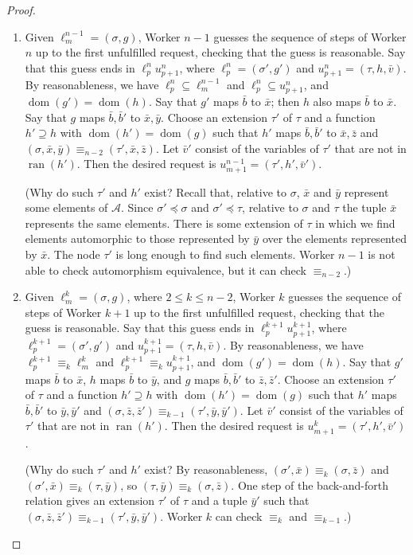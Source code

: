 \documentclass[10pt,a4paper]{article}
\DeclareMathOperator{\dom}{dom}
\DeclareMathOperator{\ran}{ran}
\theoremstyle{definition}
\begin{document}
\begin{proof}
\begin{enumerate}
			\item Given $\ell^{n-1}_m = (\sigma,g)$, Worker $n-1$ guesses the sequence of steps of Worker $n$ up to the first unfulfilled request, checking that the guess is reasonable. Say that this guess ends in $\ell^n_p u^n_{p+1}$, where $\ell^n_p = (\sigma',g')$ and $u^n_{p+1} = (\tau,h,\bar{v})$. By reasonableness, we have $\ell^n_p\subseteq\ell^{n-1}_m$ and $\ell^n_p\subseteq u^n_{p+1}$, and $\dom(g')=\dom(h)$. Say that $g'$ maps $\bar{b}$ to $\bar{x}$; then $h$ also maps $\bar{b}$ to $\bar{x}$. Say that $g$ maps $\bar{b},\bar{b}'$ to $\bar{x},\bar{y}$. Choose an extension $\tau'$ of $\tau$ and a function $h'\supseteq h$ with $\dom(h')=\dom(g)$ such that $h'$ maps $\bar{b},\bar{b}'$ to $\bar{x},\bar{z}$ and $(\sigma,\bar{x},\bar{y})\equiv_{n-2}(\tau',\bar{x},\bar{z})$. Let $\bar{v}'$ consist of the variables of $\tau'$ that are not in $\ran(h')$. Then the desired request is $u^{n-1}_{m+1}=(\tau',h',\bar{v}')$. \par (Why do such $\tau'$ and $h'$ exist? Recall that, relative to $\sigma$, $\bar{x}$ and $\bar{y}$ represent some elements of $\mathcal{A}$. Since $\sigma'\preceq\sigma$ and $\sigma'\preceq\tau$, relative to $\sigma$ and $\tau$ the tuple $\bar{x}$ represents the same elements. There is some extension of $\tau$ in which we find elements automorphic to those represented by $\bar{y}$ over the elements represented by $\bar{x}$. The node $\tau'$ is long enough to find such elements. Worker $n-1$ is not able to check automorphism equivalence, but it can check $\equiv_{n-2}$.)
			
			\item Given $\ell^k_m = (\sigma,g)$, where $2\leq k\leq n-2$, Worker $k$ guesses the sequence of steps of Worker $k+1$ up to the first unfulfilled request, checking that the guess is reasonable. Say that this guess ends in $\ell^{k+1}_p u^{k+1}_{p+1}$, where $\ell^{k+1}_p = (\sigma',g')$ and $u^{k+1}_{p+1} = (\tau,h,\bar{v})$. By reasonableness, we have $\ell^{k+1}_p\equiv_k\ell^k_m$ and $\ell^{k+1}_p\equiv_k u^{k+1}_{p+1}$, and $\dom(g')=\dom(h)$. Say that $g'$ maps $\bar{b}$ to $\bar{x}$, $h$ maps $\bar{b}$ to $\bar{y}$, and $g$ maps $\bar{b},\bar{b}'$ to $\bar{z},\bar{z}'$. Choose an extension $\tau'$ of $\tau$ and a function $h'\supseteq h$ with $\dom(h')=\dom(g)$ such that $h'$ maps $\bar{b},\bar{b}'$ to $\bar{y},\bar{y}'$ and $(\sigma,\bar{z},\bar{z}')\equiv_{k-1}(\tau',\bar{y},\bar{y}')$. Let $\bar{v}'$ consist of the variables of $\tau'$ that are not in $\ran(h')$. Then the desired request is $u^k_{m+1}=(\tau',h',\bar{v}')$. \par (Why do such $\tau'$ and $h'$ exist? By reasonableness, $(\sigma',\bar{x})\equiv_k(\sigma,\bar{z})$ and $(\sigma',\bar{x})\equiv_k(\tau,\bar{y})$, so $(\tau,\bar{y})\equiv_k(\sigma,\bar{z})$. One step of the back-and-forth relation gives an extension $\tau'$ of $\tau$ and a tuple $\bar{y}'$ such that $(\sigma,\bar{z},\bar{z}')\equiv_{k-1}(\tau',\bar{y},\bar{y}')$. Worker $k$ can check $\equiv_k$ and $\equiv_{k-1}$.)
			

\end{enumerate}
\end{proof}
\end{document}
